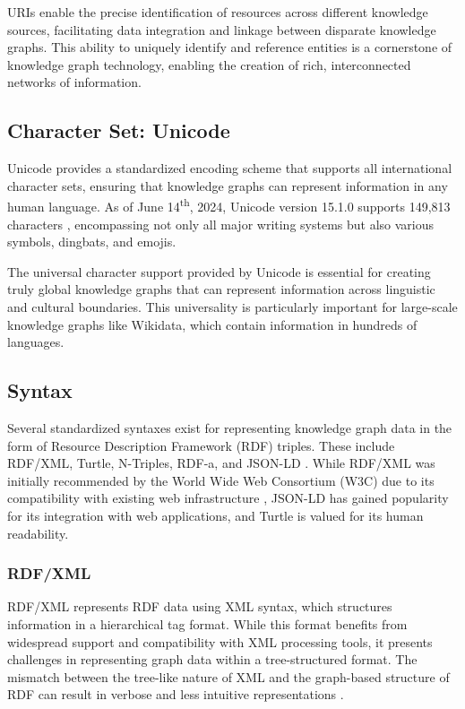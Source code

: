 URIs enable the precise identification of resources across different knowledge sources, facilitating data integration and linkage between disparate knowledge graphs. This ability to uniquely identify and reference entities is a cornerstone of knowledge graph technology, enabling the creation of rich, interconnected networks of information.

\subsection{Character Set: Unicode}
Unicode provides a standardized encoding scheme that supports all international character sets, ensuring that knowledge graphs can represent information in any human language. As of June 14\textsuperscript{th}, 2024, Unicode version 15.1.0 supports 149,813 characters \citep{unicode}, encompassing not only all major writing systems but also various symbols, dingbats, and emojis.

The universal character support provided by Unicode is essential for creating truly global knowledge graphs that can represent information across linguistic and cultural boundaries. This universality is particularly important for large-scale knowledge graphs like Wikidata, which contain information in hundreds of languages.

\subsection{Syntax}
Several standardized syntaxes exist for representing knowledge graph data in the form of Resource Description Framework (RDF) triples. These include RDF/XML, Turtle, N-Triples, RDF-a, and JSON-LD \citep{ldm2014}. While RDF/XML was initially recommended by the World Wide Web Consortium (W3C) due to its compatibility with existing web infrastructure \citep{swont2011}, JSON-LD has gained popularity for its integration with web applications, and Turtle is valued for its human readability.

\subsubsection{RDF/XML}
RDF/XML represents RDF data using XML syntax, which structures information in a hierarchical tag format. While this format benefits from widespread support and compatibility with XML processing tools, it presents challenges in representing graph data within a tree-structured format. The mismatch between the tree-like nature of XML and the graph-based structure of RDF can result in verbose and less intuitive representations \citep{rdfser2019}.

